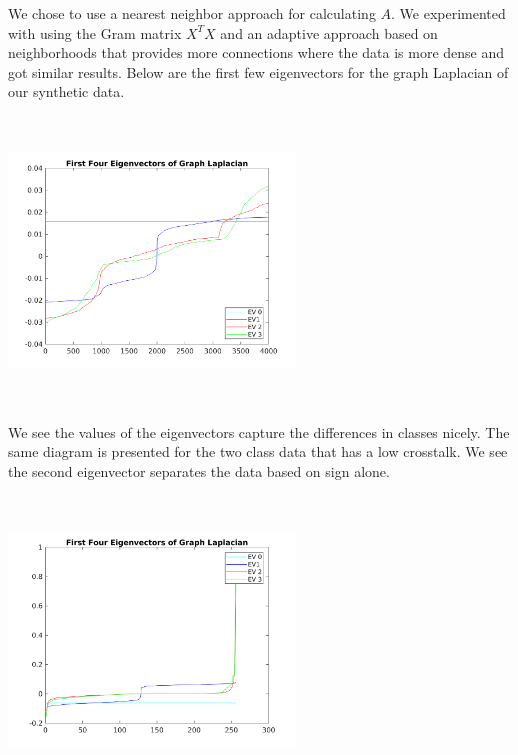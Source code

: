 We chose to use a nearest neighbor approach for calculating $A$. We experimented with using the Gram matrix $X^T X$ and an adaptive approach based on neighborhoods that provides more connections where the data is more dense and got similar results. Below are the first few eigenvectors for the graph Laplacian of our synthetic data.  

\includegraphics[width=3in,height=3in]{images/eigenvecs.png}

We see the values of the eigenvectors capture the differences in classes nicely. The same diagram is presented for the two class data that has a low crosstalk. We see the second eigenvector separates the data based on sign alone.  

\includegraphics[width=3in,height=3in]{images/EigenVectors_P1_0.100000_P2_0.200000_crosstalk_0.010000_gap_2.329507.jpg}





























